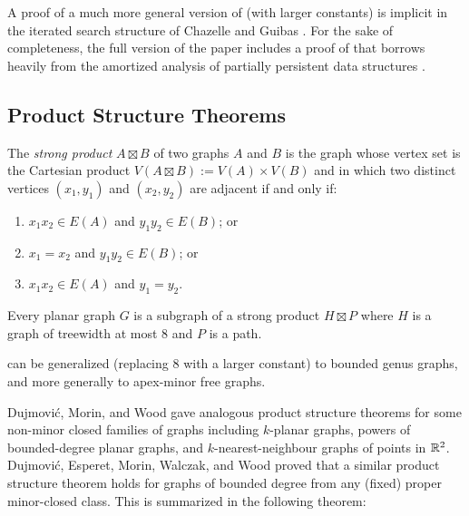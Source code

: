 \documentclass[10pt, conference, compsocconf]{IEEEtran}
\begin{document}
A proof of a much more general version of  (with larger constants) is implicit in the iterated search structure of Chazelle and Guibas \cite{chazelle.guibas:fractional1}.   For the sake of completeness, the full version of the paper includes a proof of  that borrows heavily from the amortized analysis of partially persistent data structures \cite[Section~2.3]{driscoll.sarnak.ea:making}.


\subsection{Product Structure Theorems}

The \emph{strong product} $A\boxtimes B$ of two graphs $A$ and $B$ is the graph whose vertex set is the Cartesian product $V(A\boxtimes B):=V(A)\times V(B)$ and in which two distinct vertices $(x_1,y_1)$ and $(x_2,y_2)$ are adjacent if and only if:
\begin{enumerate}
  \item  $x_1x_2 \in E(A)$ and $y_1y_2 \in E(B)$; or
  \item $x_1=x_2$ and $y_1y_2\in E(B)$; or
  \item $x_1x_2 \in E(A)$ and $y_1=y_2$.
\end{enumerate}

\begin{thm}
  Every planar graph $G$ is a subgraph of a strong product $H\boxtimes P$ where $H$ is a graph of treewidth at most 8 and $P$ is a path.
\end{thm}

 can be generalized (replacing $8$ with a larger constant) to bounded genus graphs, and more generally to apex-minor free graphs.


Dujmović, Morin, and Wood \cite{dujmovic.morin.ea:structure} gave analogous product structure theorems for some non-minor closed families of graphs including $k$-planar graphs,
powers of bounded-degree planar graphs, and $k$-nearest-neighbour graphs of points in $\mathbb{R}^2$. Dujmović, Esperet, Morin, Walczak, and Wood \cite{dujmovic.esperet.ea:clustered} proved that a similar product structure theorem holds for graphs of bounded degree from any (fixed) proper minor-closed class.  This is summarized in the following theorem:
\end{document}
